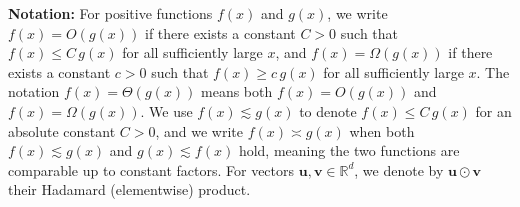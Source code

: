 \documentclass{article}
\theoremstyle{plain}
\theoremstyle{definition}
\theoremstyle{remark}
\begin{document}



\textbf{Notation:} For positive functions $f(x)$ and $g(x)$, we write $f(x)=O(g(x))$ if there exists a constant $C>0$ such that $f(x)\le C\, g(x)$ for all sufficiently large $x$, and $f(x)=\Omega(g(x))$ if there exists a constant $c>0$ such that $f(x)\ge c\, g(x)$ for all sufficiently large $x$. The notation $f(x)=\Theta(g(x))$ means both $f(x)=O(g(x))$ and $f(x)=\Omega(g(x))$. We use $f(x)\lesssim g(x)$ to denote $f(x)\le C\, g(x)$ for an absolute constant $C>0$, and we write $f(x)\asymp g(x)$ when both $f(x)\lesssim g(x)$ and $g(x)\lesssim f(x)$ hold, meaning the two functions are comparable up to constant factors. For vectors $\mathbf{u},\mathbf{v}\in\mathbb{R}^d$, we denote by $\mathbf{u}\odot \mathbf{v}$ their Hadamard (elementwise) product. 
\end{document}
